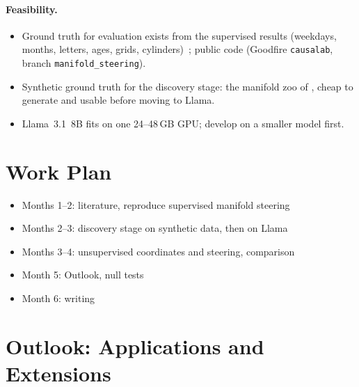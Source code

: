 \documentclass[11pt,a4paper]{article}
\newcommand{\todo}[1]{\textbf{\textcolor{red}{[TODO: #1]}}}
\newcommand{\fromnotes}[1]{\textcolor{green!50!black}{#1}}
\newcommand{\fromclaude}[1]{\textcolor{orange!85!black}{#1}}
\newcommand{\todo}[1]{\ifhmode\unskip\fi} %
\newcommand{\fromnotes}[1]{#1}
\newcommand{\fromclaude}[1]{#1}
\begin{document}
\paragraph{Feasibility.}
\begin{itemize}
  \item \fromnotes{Ground truth for evaluation exists from the supervised results (weekdays, months, letters, ages, grids, cylinders)~\cite{wurgaft2026manifoldsteering}; public code (Goodfire \texttt{causalab}, branch \texttt{manifold\_steering}).}
  \item \fromclaude{Synthetic ground truth for the discovery stage: the manifold zoo of \textcite{bhalla2026saemanifolds}, cheap to generate and usable before moving to Llama.}
  \item \fromnotes{Llama~3.1~8B fits on one 24--48\,GB GPU; develop on a smaller model first.}
\end{itemize}

\section{Work Plan}

\begin{itemize}
  \item Months 1--2: literature, reproduce supervised manifold steering
  \item Months 2--3: discovery stage on synthetic data, then on Llama
  \item Months 3--4: unsupervised coordinates and steering, comparison
  \item Month 5: Outlook, null tests
  \item Month 6: writing
\end{itemize}

\section{Outlook: Applications and Extensions}\label{sec:outlook}
\end{document}
